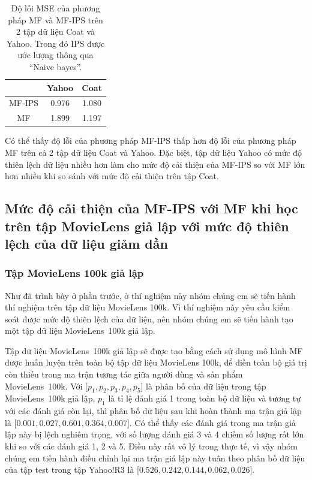 \begin{table}[h]
    \centering
    \begin{tabular}{ccc}
    \hline
     & Yahoo & Coat \\ \hline
    MF-IPS & 0.976 & 1.080 \\
    MF & 1.899 & 1.197
    \end{tabular}
    \caption{Độ lỗi MSE của phương pháp MF và MF-IPS trên 2 tập dữ liệu Coat và Yahoo. Trong đó IPS được ước lượng thông qua ``Naive bayes''.}
    \label{table:yahoo_coat_NB}
\end{table}

Có thể thấy độ lỗi của phương pháp MF-IPS thấp hơn độ lỗi của phương pháp MF trên cả 2 tập dữ liệu Coat và Yahoo. Đặc biệt, tập dữ liệu Yahoo có mức độ thiên lệch dữ liệu nhiều hơn làm cho mức độ cải thiện của MF-IPS so với MF lớn hơn nhiều khi so sánh với mức độ cải thiện trên tập Coat.

\subsection{Mức độ cải thiện của MF-IPS với MF khi học trên tập MovieLens giả lập với mức độ thiên lệch của dữ liệu giảm dần}
\subsubsection{Tập MovieLens 100k giả lập}
\label{subsubsection:MovieLens}
Như đã trình bày ở phần trước, ở thí nghiệm này nhóm chúng em sẽ tiến hành thí nghiệm trên tập dữ liệu MovieLens 100k. Vì thí nghiệm này yêu cầu kiểm soát được mức độ thiên lệch của dữ liệu, nên nhóm chúng em sẽ tiến hành tạo một tập dữ liệu MovieLens~100k giả lập. 

Tập dữ liệu MovieLens~100k giả lập sẽ được tạo bằng cách sử dụng mô hình MF được huấn luyện trên toàn bộ tập dữ liệu MovieLens 100k, để điền toàn bộ giá trị còn thiếu trong ma trận tương tác giữa người dùng và sản phẩm MovieLens~100k. Với [$p_1, p_2, p_3, p_4, p_5$] là phân bố của dữ liệu trong tập MovieLens~100k giả lập, $p_1$ là tỉ lệ đánh giá 1 trong toàn bộ dữ liệu và tương tự với các đánh giá còn lại, thì phân bố dữ liệu sau khi hoàn thành ma trận giả lập là [$0.001, 0.027, 0.601, 0.364, 0.007$]. Có thể thấy các đánh giá trong ma trận giả lập này bị lệch nghiêm trọng, với số lượng đánh giá 3 và 4 chiếm số lượng rất lớn khi so với các đánh giá 1, 2 và 5. Điều này rất vô lý trong thực tế, vì vậy nhóm chúng em tiến hành điều chỉnh lại ma trận giả lập này tuân theo phân bố dữ liệu của tập test trong tập Yahoo!R3 là [$0.526, 0.242, 0.144, 0.062, 0.026$].

